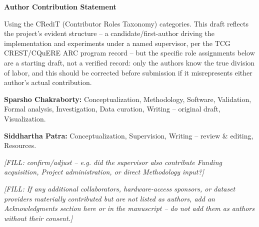 \documentclass[11pt]{article}
\begin{document}
\begin{center}
{\Large\bfseries Author Contribution Statement}
\end{center}

\bigskip
\noindent Using the CRediT (Contributor Roles Taxonomy) categories. This draft reflects the project's evident structure -- a candidate/first-author driving the implementation and experiments under a named supervisor, per the TCG CREST/CQuERE ARC program record -- but the specific role assignments below are a starting draft, not a verified record: only the authors know the true division of labor, and this should be corrected before submission if it misrepresents either author's actual contribution.

\bigskip
\noindent \textbf{Sparsho Chakraborty:} Conceptualization, Methodology, Software, Validation, Formal analysis, Investigation, Data curation, Writing -- original draft, Visualization.

\bigskip
\noindent \textbf{Siddhartha Patra:} Conceptualization, Supervision, Writing -- review \& editing, Resources.

\bigskip
\noindent \emph{[FILL: confirm/adjust -- e.g. did the supervisor also contribute Funding acquisition, Project administration, or direct Methodology input?]}

\bigskip
\noindent \emph{[FILL: If any additional collaborators, hardware-access sponsors, or dataset providers materially contributed but are not listed as authors, add an Acknowledgments section here or in the manuscript -- do not add them as authors without their consent.]}
\end{document}
